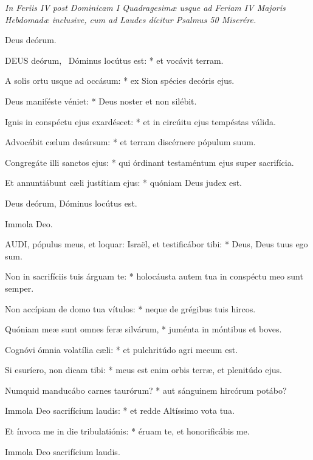 \sectionornament



\textit{In Feriis IV post Dominicam I Quadragesimæ usque ad Feriam IV Majoris Hebdomadæ inclusive, cum ad Laudes dícitur Psalmus 50 Miserére.}

 Deus deórum. \textdagger


\lettrine[lines=2]{D}{EUS} deórum, \textdagger\ Dóminus locútus est: * et vocávit terram.

A solis ortu usque ad occásum: * ex Sion spécies decóris ejus.

Deus maniféste véniet: * Deus noster et non silébit.

Ignis in conspéctu ejus exardéscet: * et in circúitu ejus tempéstas válida.

Advocábit cælum desúrsum: * et terram discérnere pópulum suum.

Congregáte illi sanctos ejus: * qui órdinant testaméntum ejus super sacrifícia.

Et annuntiábunt cæli justítiam ejus: * quóniam Deus judex est.

 Deus deórum, Dóminus locútus est.

 Immola Deo.


\lettrine[lines=2]{A}{UDI}, pópulus meus, et loquar: Israël, et testificábor tibi: * Deus, Deus tuus ego sum.

Non in sacrifíciis tuis árguam te: * holocáusta autem tua in conspéctu meo sunt semper.

Non accípiam de domo tua vítulos: * neque de grégibus tuis hircos.

Quóniam meæ sunt omnes feræ silvárum, * juménta in móntibus et boves.

Cognóvi ómnia volatília cæli: * et pulchritúdo agri mecum est.

Si esuríero, non dicam tibi: * meus est enim orbis terræ, et plenitúdo ejus.

Numquid manducábo carnes taurórum? * aut sánguinem hircórum potábo?

Immola Deo sacrifícium laudis: * et redde Altíssimo vota tua.

Et ínvoca me in die tribulatiónis: * éruam te, et honorificábis me.

 Immola Deo sacrifícium laudis.

